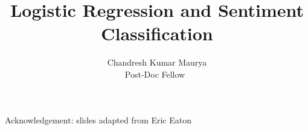 \documentclass[blue]{beamer}
\title{Logistic Regression and Sentiment Classification }
\author[Chandresh]{Chandresh Kumar Maurya \\  Post-Doc Fellow\ }
\institute{IBM Research, Bangalore}
\begin{document}
\titlepage 
{\footnotesize Acknowledgement: slides adapted from Eric Eaton}
%
%
%


%
%
%
\end{document}
